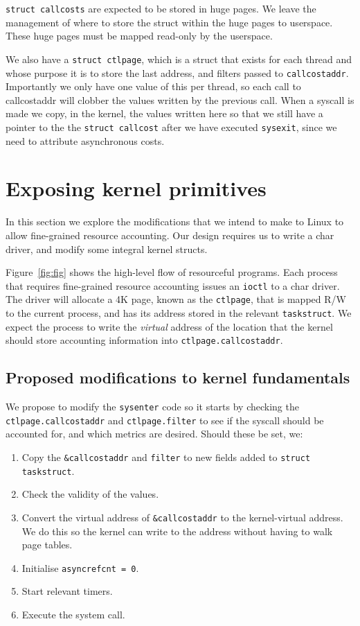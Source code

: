 \documentclass[12pt]{article}
\def\_{\textunderscore\-}
\begin{document}
  \texttt{struct call\_costs} are expected to be stored in huge pages. We leave the management of where to store the struct within the huge pages to userspace. These huge pages must be mapped read-only by the userspace.

  We also have a \texttt{struct ctl\_page}, which is a struct that exists for each thread and whose purpose it is to store the last address, and filters passed to \texttt{call\_cost\_addr}. Importantly we only have one value of this per thread, so each call to call\_cost\_addr will clobber the values written by the previous call. When a syscall is made  we copy, in the kernel, the values written here so that we still have a pointer to the the \texttt{struct call\_cost} after we have executed \texttt{sysexit}, since we need to attribute asynchronous costs.

  \section{Exposing kernel primitives}

  In this section we explore the modifications that we intend to make to Linux to allow fine-grained resource accounting. Our design requires us to write a char driver, and modify some integral kernel structs.

  Figure~\ref{fig:fig} shows the high-level flow of resourceful programs. Each process that requires fine-grained resource accounting issues an \texttt{ioctl} to a char driver. The driver will allocate a 4K page, known as the \texttt{ctl\_page}, that is mapped R/W to the current process, and has its address stored in the relevant \texttt{task\_struct}. We expect the process to write the \emph{virtual} address of the location that the kernel should store accounting information into \texttt{ctl\_page.call\_cost\_addr}.

  \subsection{Proposed modifications to kernel fundamentals}

We propose to modify the \texttt{sysenter} code so it starts by checking the \texttt{ctl\_page.call\_cost\_addr} and \texttt{ctl\_page.filter} to see if the syscall should be accounted for, and which metrics are desired. Should these be set, we:
  \begin{enumerate}
  \item Copy the \texttt{\&call\_cost\_addr} and \texttt{filter} to new fields added to \texttt{struct task\_struct}.
  \item Check the validity of the values.
  \item Convert the virtual address of \texttt{\&call\_cost\_addr} to the kernel-virtual address. We do this so the kernel can write to the address without having to walk page tables.
  \item Initialise \texttt{async\_ref\_cnt = 0}.
  \item Start relevant timers.
  \item Execute the system call.
  \end{enumerate}
\end{document}
